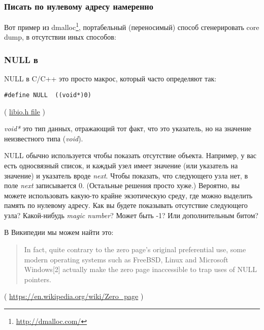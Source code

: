 \subsubsection{Писать по нулевому адресу намеренно}

Вот пример из dmalloc\footnote{\url{http://dmalloc.com/}},
портабельный (переносимый) способ сгенерировать core dump, в отсутствии иных способов:



\subsubsection{NULL в \CCpp}

NULL в C/C++ это просто макрос, который часто определяют так:

\begin{lstlisting}[style=customc]
#define NULL  ((void*)0)
\end{lstlisting}
( \href{https://github.com/wzhy90/linaro_toolchains/blob/8ff8ae680bac04558d10cc9626e12c4c2f6c1348/arm-cortex_a15-linux-gnueabihf/libc/usr/include/libio.h#L70}{libio.h file} )

\emph{void*} это тип данных, отражающий тот факт, что это указатель, но на значение неизвестного типа (\emph{void}).

NULL обычно используется чтобы показать отсутствие объекта.
Например, у вас есть односвязный список, и каждый узел имеет значение (или указатель на значение) и указатель вроде \emph{next}.
Чтобы показать, что следующего узла нет, в поле \emph{next} записывается 0.
(Остальные решения просто хуже.)
Вероятно, вы можете использовать какую-то крайне экзотическую среду, где можно выделить память по нулевому адресу.
Как вы будете показывать отсутствие следующего узла?
Какой-нибудь \emph{magic number}? Может быть -1? Или дополнительным битом?

В Википедии мы можем найти это:

\begin{framed}
\begin{quotation}
In fact, quite contrary to the zero page's original preferential use, some modern operating systems such as FreeBSD, Linux and Microsoft Windows[2] actually make the zero page inaccessible to trap uses of NULL pointers. 
\end{quotation}
\end{framed}
( \url{https://en.wikipedia.org/wiki/Zero_page} )

